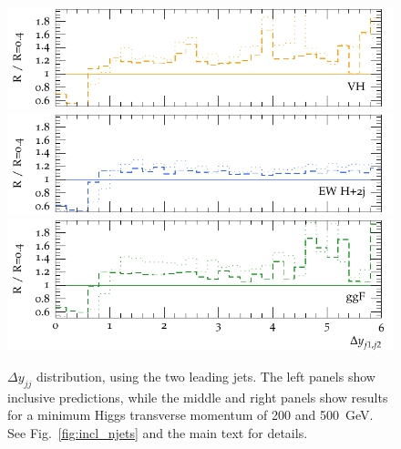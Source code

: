 \documentclass[10pt,prd,fleqn,superscriptaddress,notitlepage,nofootinbib,preprintnumbers,nobalancelastpage]{revtex4-1}
\begin{document}
\begin{figure}[p]
\begin{minipage}{.2925\textwidth}
    \includegraphics[width=\textwidth]{figures/channels/delta_y_jj12_pth500_rVH.pdf}
    \includegraphics[width=\textwidth]{figures/channels/delta_y_jj12_pth500_rHJJ.pdf}
    \includegraphics[width=\textwidth]{figures/channels/delta_y_jj12_pth500_rGGH.pdf}
  \end{minipage}
\caption{$\Delta y_{jj}$ distribution, using the two leading jets.
The left panels show inclusive predictions, while the middle and right panels
show results for a minimum Higgs transverse momentum of 200 and 500~GeV.
See Fig.~\ref{fig:incl_njets} and the main text for details.}
\label{fig:incl_delta_y_jj12}
\end{figure}
\end{document}
